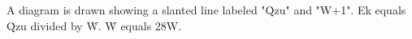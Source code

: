 A diagram is drawn showing a slanted line labeled "Q̇zu" and "W+1".  
Ek equals Q̇zu divided by Ẇ.  
Ẇ equals 28W.